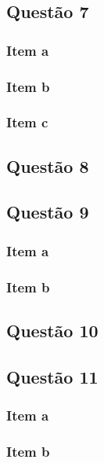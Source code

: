 \documentclass[a4paper, 12pt]{article}
\begin{document}
		\subsection{Questão 7} 
			\subsubsection{Item a}
			\subsubsection{Item b}			   		   
			\subsubsection{Item c}			   			
		\subsection{Questão 8}    
		\subsection{Questão 9}  
			\subsubsection{Item a}
			\subsubsection{Item b}			  
		\subsection{Questão 10}    
		\subsection{Questão 11}     
			\subsubsection{Item a}
			\subsubsection{Item b}			  		
\end{document}
